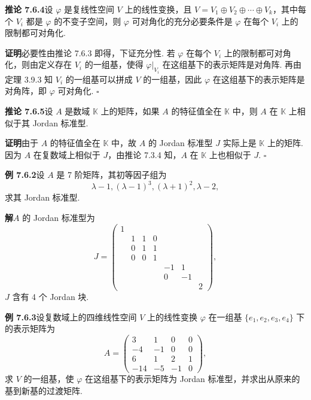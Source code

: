 \documentclass[UTF8, 12pt, fontset=fandol, oneside]{ctexart}
\begin{document}
\noindent\textbf{推论 7.6.4}\quad 设 $\varphi$ 是复线性空间 $V$ 上的线性变换，且 $V=V_1\oplus V_2\oplus\cdots\oplus V_k$，其中每个 $V_i$ 都是 $\varphi$ 的不变子空间，则 $\varphi$ 可对角化的充分必要条件是 $\varphi$ 在每个 $V_i$ 上的限制都可对角化.

\noindent\textbf{证明}\quad 必要性由推论 7.6.3 即得，下证充分性. 若 $\varphi$ 在每个 $V_i$ 上的限制都可对角化，则由定义存在 $V_i$ 的一组基，使得 $\varphi|_{V_i}$ 在这组基下的表示矩阵是对角阵. 再由定理 3.9.3 知 $V_i$ 的一组基可以拼成 $V$ 的一组基，因此 $\varphi$ 在这组基下的表示矩阵是对角阵，即 $\varphi$ 可对角化. $\square$

\noindent\textbf{推论 7.6.5}\quad 设 $A$ 是数域 $\mathbb{K}$ 上的矩阵，如果 $A$ 的特征值全在 $\mathbb{K}$ 中，则 $A$ 在 $\mathbb{K}$ 上相似于其 Jordan 标准型.

\noindent\textbf{证明}\quad 由于 $A$ 的特征值全在 $\mathbb{K}$ 中，故 $A$ 的 Jordan 标准型 $J$ 实际上是 $\mathbb{K}$ 上的矩阵. 因为 $A$ 在复数域上相似于 $J$，由推论 7.3.4 知，$A$ 在 $\mathbb{K}$ 上也相似于 $J$. $\square$

\noindent\textbf{例 7.6.2}\quad 设 $A$ 是 7 阶矩阵，其初等因子组为
\[
\lambda-1,(\lambda-1)^3,(\lambda+1)^2,\lambda-2,
\]
求其 Jordan 标准型.

\noindent\textbf{解}\quad $A$ 的 Jordan 标准型为
\[
J=\left(\begin{array}{ccccccc}
1 & & & & & & \\
& 1 & 1 & 0 & & & \\
& 0 & 1 & 1 & & & \\
& 0 & 0 & 1 & & & \\
& & & & -1 & 1 & \\
& & & & 0 & -1 & \\
& & & & & & 2
\end{array}\right),
\]
$J$ 含有 4 个 Jordan 块.

\noindent\textbf{例 7.6.3}\quad 设复数域上的四维线性空间 $V$ 上的线性变换 $\varphi$ 在一组基 $\{e_1,e_2,e_3,e_4\}$ 下的表示矩阵为
\[
A=\left(\begin{array}{cccc}
3 & 1 & 0 & 0\\
-4 & -1 & 0 & 0\\
6 & 1 & 2 & 1\\
-14 & -5 & -1 & 0
\end{array}\right),
\]
求 $V$ 的一组基，使 $\varphi$ 在这组基下的表示矩阵为 Jordan 标准型，并求出从原来的基到新基的过渡矩阵.
\end{document}
